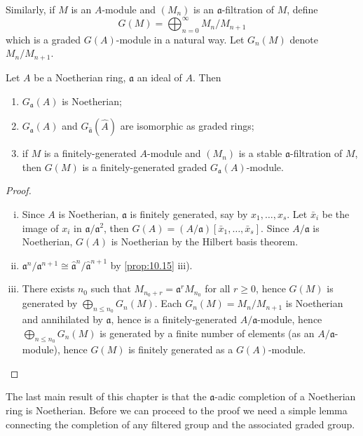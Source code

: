 Similarly, if $M$ is an $A$-module and $(M_n)$ is an $\mathfrak{a}$-filtration of $M$, define
\[
G(M) = \bigoplus_{n=0}^{\infty} M_n/M_{n+1}
\]
which is a graded $G(A)$-module in a natural way. Let $G_n(M)$ denote $M_n/M_{n+1}$.

\begin{proposition}\label{prop:10.22}
Let $A$ be a Noetherian ring, $\mathfrak{a}$ an ideal of $A$. Then
\begin{enumerate}
    \item[i)] $G_{\mathfrak{a}}(A)$ is Noetherian;
    \item[ii)] $G_{\mathfrak{a}}(A)$ and $G_{\hat{\mathfrak{a}}}(\hat{A})$ are isomorphic as graded rings;
    \item[iii)] if $M$ is a finitely-generated $A$-module and $(M_n)$ is a stable $\mathfrak{a}$-filtration of $M$, then $G(M)$ is a finitely-generated graded $G_{\mathfrak{a}}(A)$-module.
\end{enumerate}
\end{proposition}
\begin{proof}
    \begin{enumerate}[i)]
        \item Since $A$ is Noetherian, $\mathfrak{a}$ is finitely generated, say by $x_1, \ldots, x_s$. Let $\bar{x}_i$ be the image of $x_i$ in $\mathfrak{a}/\mathfrak{a}^2$, then $G(A) = (A/\mathfrak{a})[\bar{x}_1, \ldots, \bar{x}_s]$. Since $A/\mathfrak{a}$ is Noetherian, $G(A)$ is Noetherian by the Hilbert basis theorem.
        \item $\mathfrak{a}^n/\mathfrak{a}^{n+1} \cong \hat{\mathfrak{a}}^n/\hat{\mathfrak{a}}^{n+1}$ by \eqref{prop:10.15} iii).
        \item There exists $n_0$ such that $M_{n_0+r} = \mathfrak{a}^r M_{n_0}$ for all $r \ge 0$, hence $G(M)$ is generated by $\bigoplus_{n \le n_0} G_n(M)$. Each $G_n(M) = M_n/M_{n+1}$ is Noetherian and annihilated by $\mathfrak{a}$, hence is a finitely-generated $A/\mathfrak{a}$-module, hence $\bigoplus_{n \le n_0} G_n(M)$ is generated by a finite number of elements (as an $A/\mathfrak{a}$-module), hence $G(M)$ is finitely generated as a $G(A)$-module.
    \end{enumerate}
\end{proof}

The last main result of this chapter is that the $\mathfrak{a}$-adic completion of a Noetherian ring is Noetherian. Before we can proceed to the proof we need a simple lemma connecting the completion of any filtered group and the associated graded group.

